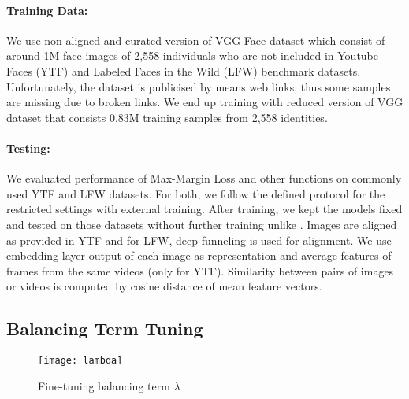 \documentclass[10pt,twocolumn,letterpaper]{article}
\newcommand{\margin}{Max-Margin Loss\xspace}
\begin{document}
\paragraph{Training Data:} We use non-aligned and curated version of VGG Face dataset \cite{parkhi2015deep} which consist of around 1M face images of 2,558 individuals who are not included in Youtube Faces (YTF) \cite{wolf2011face} and Labeled Faces in the Wild (LFW) \cite{huang2007labeled} benchmark datasets. Unfortunately, the dataset is publicised by means web links, thus some samples are missing due to broken links. We end up training with reduced version of VGG dataset that consists 0.83M training samples from 2,558 identities.

\paragraph{Testing:} We evaluated performance of \margin and other functions on commonly used YTF and LFW datasets. For both, we follow the defined protocol for the restricted settings with external training. After training, we kept the models fixed and tested on those datasets without further training unlike \cite{parkhi2015deep}. Images are aligned as provided in YTF and for LFW, deep funneling \cite{Huang2012a} is used for alignment. We use embedding layer output of each image as representation and average features of frames from the same videos (only for YTF). Similarity between pairs of images or videos is computed by cosine distance of mean feature vectors. 





\subsection{Balancing Term Tuning}
\begin{figure}
\begin{center}

\vspace{-0.2in}
\texttt{[image: lambda]}

\caption{Fine-tuning balancing term $\lambda$}
\label{fig:lambda}
\end{center}
\end{figure}
\end{document}

